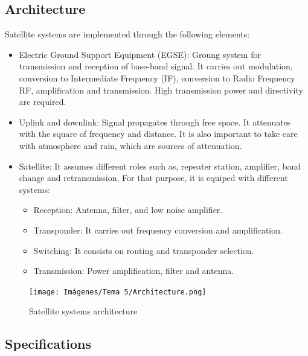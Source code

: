 \documentclass[
	12pt,
	twoside
]{book}
\begin{document}
\subsection{Architecture}

Satellite systems are implemented through the following elements:
\begin{itemize}
	\item Electric Ground Support Equipment (EGSE): Groung system for transmission and reception of base-band signal. It carries out modulation, conversion to Intermediate Frequency (IF), conversion to Radio Frequency RF, amplification and transmission. High transmission power and directivity are required.
	\item Uplink and downlink: Signal propagates through free space. It attenuates with the square of frequency and distance. It is also important to take care with atmosphere and rain, which are sources of attenuation.
	\item {
		Satellite: It assumes different roles such as, repeater station, amplifier, band change and retransmission. For that purpose, it is equiped with different systems:
		\begin{itemize}
			\item Reception: Antenna, filter, and low noise amplifier.
			\item Transponder: It carries out frequency conversion and amplification.
			\item Switching: It consists on routing and transponder selection.
			\item Transmission: Power amplification, filter and antenna.
		\end{itemize}
	}
\end{itemize}

\begin{figure}[H]
	\centering
	\texttt{[image: Imágenes/Tema 5/Architecture.png]}
	\caption{
		\label{fig:unit5_Architecture}
		Satellite systems architecture
	}
\end{figure}

\subsection{Specifications}
\end{document}
